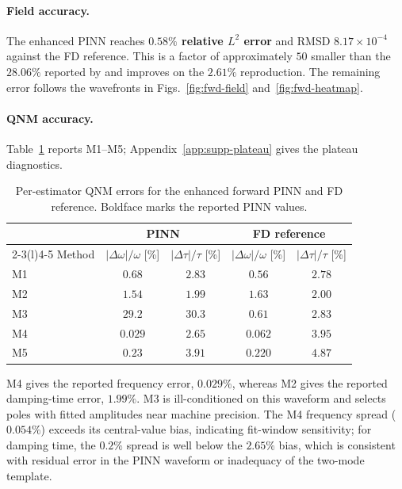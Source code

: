 \FloatBarrier

\paragraph{Field accuracy.} The enhanced PINN reaches
\textbf{$0.58\%$ relative $L^2$ error} and RMSD
$8.17\times10^{-4}$ against the FD reference. This is a factor of
approximately $50$ smaller than the $28.06\%$ reported by
\citet[Table~2]{Patel2024pinn} and improves on the $2.61\%$
reproduction. The remaining error follows the wavefronts in
Figs.~\ref{fig:fwd-field} and~\ref{fig:fwd-heatmap}.

\paragraph{QNM accuracy.} Table~\ref{tab:fwd-qnm} reports M1--M5;
Appendix~\ref{app:supp-plateau} gives the plateau diagnostics.

\begin{table}[!htbp]
\centering
\caption{Per-estimator QNM errors for the enhanced forward PINN and
FD reference. Boldface marks the reported PINN values.}
\label{tab:fwd-qnm}
\footnotesize
\setlength{\tabcolsep}{5pt}
\renewcommand{\arraystretch}{1.15}
\begin{tabular}{@{}lcccc@{}}
\toprule
 & \multicolumn{2}{c}{PINN} & \multicolumn{2}{c}{FD reference} \\
\cmidrule(lr){2-3}\cmidrule(l){4-5}
Method & $|\Delta\omega|/\omega$ [\%] & $|\Delta\tau|/\tau$ [\%]
 & $|\Delta\omega|/\omega$ [\%] & $|\Delta\tau|/\tau$ [\%] \\
\midrule
M1 & $0.68$ & $2.83$ & $0.56$ & $2.78$ \\
M2 & $1.54$ & $\mathbf{1.99}$ & $1.63$ & $2.00$ \\
M3 & $29.2$ & $30.3$ & $0.61$ & $2.83$ \\
M4 & $\mathbf{0.029}$ & $2.65$ & $0.062$ & $3.95$ \\
M5 & $0.23$ & $3.91$ & $0.220$ & $4.87$ \\
\bottomrule
\end{tabular}
\end{table}

M4 gives the reported frequency error, $0.029\%$, whereas M2 gives
the reported damping-time error, $1.99\%$. M3 is ill-conditioned on
this waveform and selects poles with fitted amplitudes near machine
precision. The
M4 frequency spread ($0.054\%$) exceeds its central-value bias,
indicating fit-window sensitivity; for damping time, the $0.2\%$
spread is well below the $2.65\%$ bias, which is consistent with
residual error in the PINN waveform or inadequacy of the two-mode
template.


